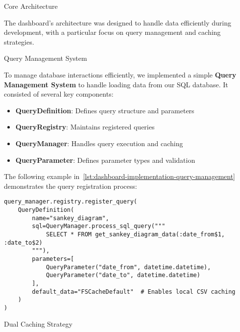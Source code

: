 \begin{section}{Core Architecture}
	\label{sec:implementation-core-architecture}

	The dashboard's architecture was designed to handle data efficiently during development, with a particular focus on query management and caching strategies.

	\begin{subsection}{Query Management System}
		\label{subsec:implementation-core-architecture-query-management}

		To manage database interactions efficiently, we implemented a simple \textbf{Query Management System} to handle loading data from our SQL database.
		It consisted of several key components:

		\begin{itemize}
			\item \textbf{QueryDefinition}: Defines query structure and parameters
			\item \textbf{QueryRegistry}: Maintains registered queries
			\item \textbf{QueryManager}: Handles query execution and caching
			\item \textbf{QueryParameter}: Defines parameter types and validation
		\end{itemize}

		The following example in~\autoref{lst:dashboard-implementation-query-management} demonstrates the query registration process:

		\begin{listing}[H]
			\caption{Query Management Example}
			\begin{verbatim}
query_manager.registry.register_query(
    QueryDefinition(
        name="sankey_diagram",
        sql=QueryManager.process_sql_query("""
            SELECT * FROM get_sankey_diagram_data(:date_from$1, :date_to$2)
        """),
        parameters=[
            QueryParameter("date_from", datetime.datetime),
            QueryParameter("date_to", datetime.datetime)
        ],
        default_data="FSCacheDefault"  # Enables local CSV caching
    )
)
			\end{verbatim}
			\label{lst:dashboard-implementation-query-management}
		\end{listing}
	\end{subsection}

	\begin{subsection}{Dual Caching Strategy}
		\label{subsec:implementation-core-architecture-caching}


\end{subsection}
\end{section}
